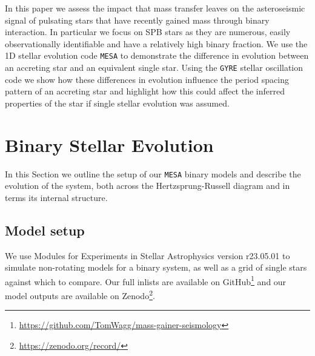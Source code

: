 \documentclass[twocolumn, twocolappendix, oneside]{aastex631}
\newcommand{\hrd}{Hertzsprung-Russell diagram\xspace}
\newcommand{\mesa}{\texttt{MESA}\xspace}
\newcommand{\gyre}{\texttt{GYRE}\xspace}
\begin{document}
In this paper we assess the impact that mass transfer leaves on the asteroseismic signal of pulsating stars that have recently gained mass through binary interaction. In particular we focus on SPB stars as they are numerous, easily observationally identifiable and have a relatively high binary fraction. We use the 1D stellar evolution code \mesa to demonstrate the difference in evolution between an accreting star and an equivalent single star. Using the \gyre stellar oscillation code we show how these differences in evolution influence the period spacing pattern of an accreting star and highlight how this could affect the inferred properties of the star if single stellar evolution was assumed.

\section{Binary Stellar Evolution} \label{sec:methods}

In this Section we outline the setup of our \mesa binary models and describe the evolution of the system, both across the \hrd and in terms its internal structure.

\subsection{Model setup}

We use Modules for Experiments in Stellar Astrophysics \citep[\mesa,][]{Paxton2011, Paxton2013, Paxton2015, Paxton2018, Paxton2019, Jermyn2023} version r23.05.01 \citep{mesa_zenodo} to simulate non-rotating models for a binary system, as well as a grid of single stars against which to compare. Our full inlists are available on GitHub\footnote{\url{https://github.com/TomWagg/mass-gainer-seismology}} and our model outputs are available on Zenodo\footnote{\url{https://zenodo.org/record/}}.

\end{document}

